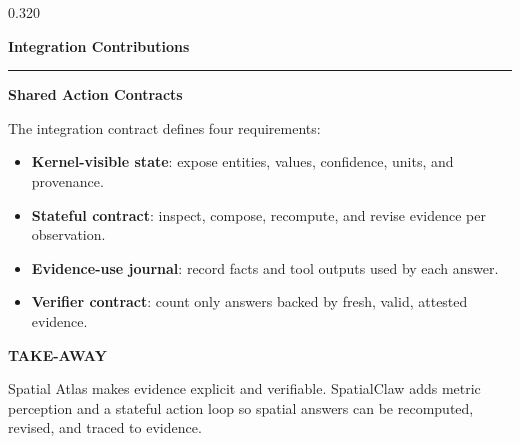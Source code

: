 \documentclass{beamer}
\newenvironment{possection}[2]{%
  \par\vspace{0.10cm}%
  \noindent{\color{ncgreendark}\bfseries\large #1}\hspace{0.42em}%
  {\color{ncink}\bfseries\large #2}\par\vspace{-0.20cm}%
  \noindent\textcolor{ncline}{\rule{\linewidth}{0.9pt}}\par\vspace{0cm}%
  \begin{minipage}{\linewidth}%
}{%
  \end{minipage}\par\vspace{0.40cm}%
}
\newcommand{\possub}[2]{%
  \par\vspace{0.02cm}%
  \noindent{\color{ncgreendark}\bfseries #1}\hspace{0.38em}%
  {\color{ncink}\bfseries #2}\par\vspace{0.07cm}%
}
\begin{document}
\begin{frame}[t]
\begin{columns}[t,onlytextwidth]
\begin{column}{0.320\textwidth}
\begin{possection}{7.}{Integration Contributions}
    \possub{7.2}{Shared Action Contracts}
    The integration contract defines four requirements:
    \begin{itemize}\setlength{\itemsep}{2pt}
      \item \textbf{Kernel-visible state}: expose entities, values, confidence,
            units, and provenance.
      \item \textbf{Stateful contract}: inspect, compose, recompute, and revise
            evidence per observation.
      \item \textbf{Evidence-use journal}: record facts and tool outputs used
            by each answer.
      \item \textbf{Verifier contract}: count only answers backed by fresh,
            valid, attested evidence.
    \end{itemize}
    \par\vspace{0.20cm}
    \begin{takeaway}
      {\ttfamily\footnotesize\bfseries\color{ncgreendark}\MakeUppercase{Take-away}}\par
      \vspace{0.12cm}
      {\color{ncink}\normalsize Spatial Atlas makes evidence explicit and
      verifiable. SpatialClaw adds metric perception and a stateful action loop
      so spatial answers can be recomputed, revised, and traced to evidence.}
    \end{takeaway}
  \end{possection}

  \vspace{-0.40cm}

\end{column}

\end{columns}
\end{frame}
\end{document}
